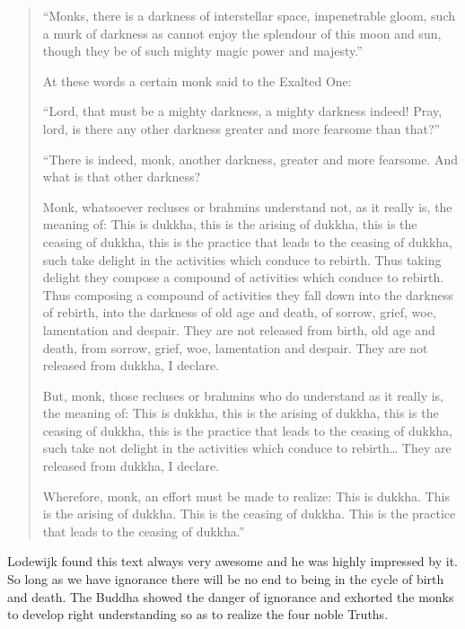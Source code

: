 \begin{quote}
``Monks, there is a darkness of interstellar space, impenetrable gloom,
such a murk of darkness as cannot enjoy the splendour of this moon and
sun, though they be of such mighty magic power and majesty.''

At these words a certain monk said to the Exalted One:

``Lord, that must be a mighty darkness, a mighty darkness indeed! Pray,
lord, is there any other darkness greater and more fearsome than that?''

``There is indeed, monk, another darkness, greater and more fearsome.
And what is that other darkness?

Monk, whatsoever recluses or brahmins understand not, as it really is,
the meaning of: This is dukkha, this is the arising of dukkha, this is
the ceasing of dukkha, this is the practice that leads to the ceasing of
dukkha, such take delight in the activities which conduce to rebirth.
Thus taking delight they compose a compound of activities which conduce
to rebirth. Thus composing a compound of activities they fall down into
the darkness of rebirth, into the darkness of old age and death, of
sorrow, grief, woe, lamentation and despair. They are not released from
birth, old age and death, from sorrow, grief, woe, lamentation and
despair. They are not released from dukkha, I declare.

But, monk, those recluses or brahmins who do understand as it really is,
the meaning of: This is dukkha, this is the arising of dukkha, this is
the ceasing of dukkha, this is the practice that leads to the ceasing of
dukkha, such take not delight in the activities which conduce to
rebirth\ldots{} They are released from dukkha, I declare.

Wherefore, monk, an effort must be made to realize: This is dukkha. This
is the arising of dukkha. This is the ceasing of dukkha. This is the
practice that leads to the ceasing of dukkha.''
\end{quote}

Lodewijk found this text always very awesome and he was highly impressed
by it. So long as we have ignorance there will be no end to being in the
cycle of birth and death. The Buddha showed the danger of ignorance and
exhorted the monks to develop right understanding so as to realize the
four noble Truths.

